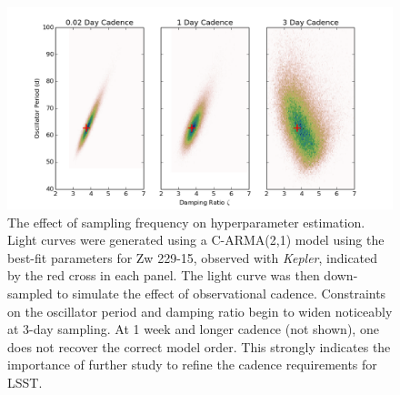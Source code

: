 \begin{figure}
\includegraphics[width=5.0in]{figs/agn/AGN_Variability_00.png}
\caption{The effect of sampling frequency on hyperparameter estimation. Light curves
were generated using a C-ARMA(2,1) model using the best-fit parameters for Zw 229-15,
observed with {\em Kepler}, indicated by the red cross in each panel. The light curve
was then down-sampled to simulate the effect of observational cadence. Constraints on
the oscillator period and damping ratio begin to widen noticeably at 3-day sampling.
At 1 week and longer cadence (not shown), one does not recover the correct model order.
This strongly indicates the importance of further study to refine the cadence
requirements for LSST.
}
\label{CadenceEffect}
\end{figure}



